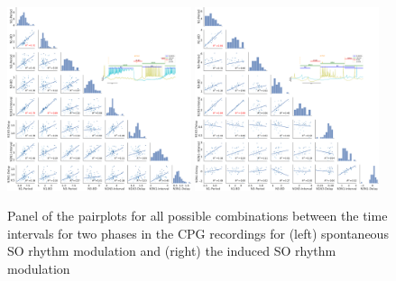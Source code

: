  
\begin{figure}[htbp]
	\centering
	\includegraphics[width=0.48\textwidth]{./img/invariants/data/SUSSEX/prep4_so_driven_2/images/panel_with_pairplot.pdf}
	\includegraphics[width=0.48\textwidth]{./img/invariants/data/SUSSEX/SO_driven/images/panel_with_pairplot.pdf}
	\caption{Panel of the pairplots for all possible combinations between the time intervals for two phases in the CPG recordings for (left) spontaneous SO rhythm modulation and (right) the induced SO rhythm modulation}
	\label{fig:so pairplot comparison}
\end{figure}

